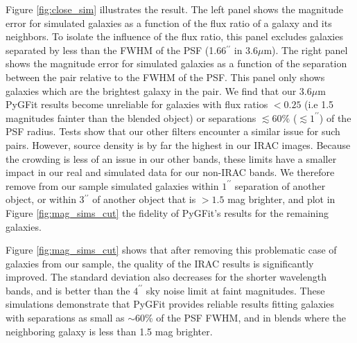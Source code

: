 \documentclass[preprint]{aastex}
\newcommand{\sersic}{S\'{e}rsic}
\newcommand{\pygfit}{PyGFit}
\begin{document}

Figure \ref{fig:close_sim} illustrates the result.  The left panel shows the magnitude error for simulated galaxies as a function of the flux ratio of a galaxy and its neighbors.  To isolate the influence of the flux ratio, this panel excludes galaxies separated by less than the FWHM of the PSF (1.66$^{\prime\prime}$ in $3.6\mu$m).  The right panel shows the magnitude error for simulated galaxies as a function of the separation between the pair relative to the FWHM of the PSF.  This panel only shows galaxies which are the brightest galaxy in the pair.  We find that our $3.6\mu$m \pygfit{} results become unreliable for galaxies with flux ratios $<0.25$ (i.e 1.5 magnitudes fainter than the blended object) or separations $\lesssim60\%$ ($\lesssim1^{\prime\prime}$) of the PSF radius.  Tests show that our other filters encounter a similar issue for such pairs.  However, source density is by far the highest in our IRAC images.  Because the crowding is less of an issue in our other bands, these limits have a smaller impact in our real and simulated data for our non-IRAC bands.  We therefore remove from our sample simulated galaxies within $1^{\prime\prime}$ separation of another object, or within 3$^{\prime\prime}$ of another object that is $>1.5$ mag brighter, and plot in Figure \ref{fig:mag_sims_cut} the fidelity of \pygfit{}'s results for the remaining galaxies.

Figure \ref{fig:mag_sims_cut} shows that after removing this problematic case of galaxies from our sample, the quality of the IRAC results is significantly improved. The standard deviation also decreases for the shorter wavelength bands, and is better than the $4^{\prime\prime}$ sky noise limit at faint magnitudes.  These simulations demonstrate that \pygfit{} provides reliable results fitting galaxies with separations as small as $\sim60$\% of the PSF FWHM, and in blends where the neighboring galaxy is less than 1.5 mag brighter. 
\end{document}
